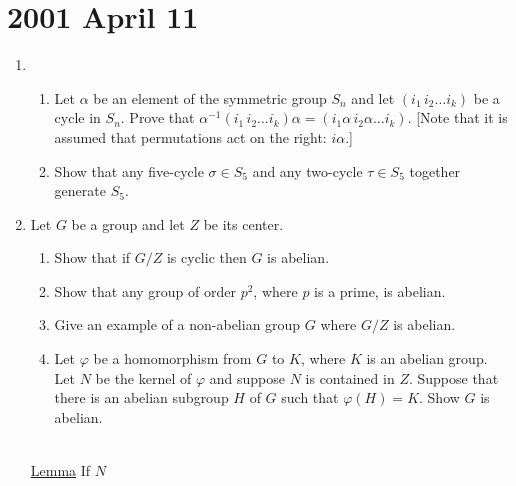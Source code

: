 \documentclass[wjd,wjdthms,boldvectors]{wjdarticle}
\begin{document}
\section{2001 April 11}
\begin{enumerate}[{\bf 1.}]

\item 
\begin{enumerate}[{\bf a.}]
\item Let $\alpha$ be an element of the symmetric group $S_n$ and let $(i_1 \, i_2\dots i_k)$ 
be a cycle in $S_n$.  Prove that 
$\alpha^{-1}(i_1 \, i_2\dots i_k) \alpha = (i_1\alpha \, i_2\alpha \dots i_k)$.
[Note that it is assumed that permutations act on the right: $i\alpha$.]
\item
Show that any five-cycle $\sigma \in S_5$ and any two-cycle $\tau \in S_5$ together
generate $S_5$.
\end{enumerate}

\item\protect\hspace{-2mm}\footnotemark
{}
Let $G$ be a group and let $Z$ be its center.
\begin{enumerate}[{\bf a.}]
\item Show that if $G/Z$ is cyclic then $G$ is abelian.
\item Show that any group of order $p^2$, where $p$ is a prime, is abelian.
\item Give an example of a non-abelian group $G$ where $G/Z$ is abelian.
\item Let $\varphi$ be a homomorphism from $G$ to $K$, where $K$ is an abelian group. Let $N$
  be the kernel of $\varphi$ and suppose $N$ is contained in $Z$.  Suppose that there is
  an abelian subgroup $H$ of $G$ such that $\varphi(H) = K$.  Show $G$ is abelian.
\end{enumerate}
\begin{solution}~\\
\underline{Lemma} If $N$

\end{solution}



\end{enumerate}





\end{document}
